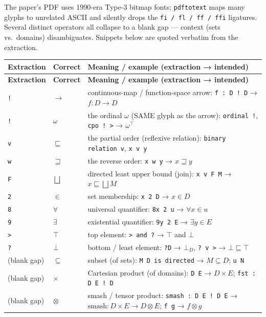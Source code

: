 \documentclass[10pt]{article}
\newcommand{\ex}[1]{\texttt{#1}}                      %
\newcommand{\uni}[1]{$#1$}                            %
\begin{document}
{\footnotesize
The paper's PDF uses 1990-era Type-3 bitmap fonts; \texttt{pdftotext} maps many
glyphs to unrelated ASCII and silently drops the \texttt{fi\,/\,fl\,/\,ff\,/\,ffi}
ligatures. Several distinct operators all collapse to a blank gap — context (sets
vs.\ domains) disambiguates. Snippets below are quoted verbatim from the
extraction.

\begin{longtable}{@{}p{2.2cm}p{1.7cm}p{12.3cm}@{}}
\toprule
\textbf{Extraction} & \textbf{Correct} & \textbf{Meaning / example (extraction → intended)} \\
\midrule
\endfirsthead
\toprule
\textbf{Extraction} & \textbf{Correct} & \textbf{Meaning / example (extraction → intended)} \\
\midrule
\endhead
\ex{!}        & \uni{\to}      & continuous-map / function-space arrow: \ex{f : D ! D} → $f : D \to D$ \\
\ex{!}        & \uni{\omega}   & the ordinal $\omega$ (SAME glyph as the arrow): \ex{ordinal !}, \ex{cpo ! >} → $\omega^{\top}$ \\
\ex{v}        & \uni{\sqsubseteq} & the partial order (reflexive relation): \ex{binary relation v}, \ex{x v y} \\
\ex{w}        & \uni{\sqsupseteq} & the reverse order: \ex{x w y} → $x \sqsupseteq y$ \\
\ex{F}        & \uni{\bigsqcup} & directed least upper bound (join): \ex{x v F M} → $x \sqsubseteq \bigsqcup M$ \\
\ex{2}        & \uni{\in}      & set membership: \ex{x 2 D} → $x \in D$ \\
\ex{8}        & \uni{\forall}  & universal quantifier: \ex{8x 2 u} → $\forall x \in u$ \\
\ex{9}        & \uni{\exists}  & existential quantifier: \ex{9y 2 E} → $\exists y \in E$ \\
\ex{>}        & \uni{\top}     & top element: \ex{> and ?} → $\top$ and $\bot$ \\
\ex{?}        & \uni{\bot}     & bottom / least element: \ex{?D} → $\bot_{D}$, \ex{? v >} → $\bot \sqsubseteq \top$ \\
(blank gap)   & \uni{\subseteq} & subset (of sets): \ex{M  D is directed} → $M \subseteq D$; \ex{u  N} \\
(blank gap)   & \uni{\times}   & Cartesian product (of domains): \ex{D  E} → $D \times E$; \ex{fst : D  E ! D} \\
(blank gap)   & \uni{\otimes}  & smash / tensor product: \ex{smash : D  E ! D E} → $\mathrm{smash}:D\times E\to D\otimes E$; \ex{f g} → $f\otimes g$ \\

\end{longtable}}
\end{document}

